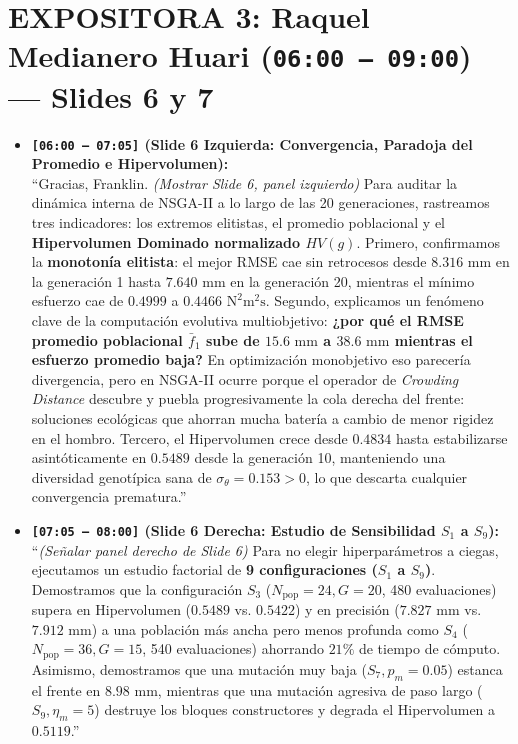 \documentclass[11pt,a4paper]{article}
\begin{document}
\section*{EXPOSITORA 3: Raquel Medianero Huari (\texttt{06:00 -- 09:00}) — Slides 6 y 7}
\begin{itemize}
    \item \textbf{\texttt{[06:00 -- 07:05]} (Slide 6 Izquierda: Convergencia, Paradoja del Promedio e Hipervolumen):} \\
    ``Gracias, Franklin. \textit{(Mostrar Slide 6, panel izquierdo)} Para auditar la dinámica interna de NSGA-II a lo largo de las 20 generaciones, rastreamos tres indicadores: los extremos elitistas, el promedio poblacional y el \textbf{Hipervolumen Dominado normalizado $HV(g)$}. Primero, confirmamos la \textbf{monotonía elitista}: el mejor RMSE cae sin retrocesos desde $8.316\text{ mm}$ en la generación 1 hasta \textbf{$7.640\text{ mm}$} en la generación 20, mientras el mínimo esfuerzo cae de $0.4999$ a \textbf{$0.4466\text{ N}^2\text{m}^2\text{s}$}. Segundo, explicamos un fenómeno clave de la computación evolutiva multiobjetivo: \textbf{¿por qué el RMSE promedio poblacional $\bar{f}_1$ sube de $15.6\text{ mm}$ a $38.6\text{ mm}$ mientras el esfuerzo promedio baja?} En optimización monobjetivo eso parecería divergencia, pero en NSGA-II ocurre porque el operador de \textit{Crowding Distance} descubre y puebla progresivamente la cola derecha del frente: soluciones ecológicas que ahorran mucha batería a cambio de menor rigidez en el hombro. Tercero, el Hipervolumen crece desde $0.4834$ hasta estabilizarse asintóticamente en \textbf{$0.5489$} desde la generación 10, manteniendo una diversidad genotípica sana de $\sigma_\theta = 0.153 > 0$, lo que descarta cualquier convergencia prematura.''

    \item \textbf{\texttt{[07:05 -- 08:00]} (Slide 6 Derecha: Estudio de Sensibilidad $S_1$ a $S_9$):} \\
    ``\textit{(Señalar panel derecho de Slide 6)} Para no elegir hiperparámetros a ciegas, ejecutamos un estudio factorial de \textbf{9 configuraciones ($S_1$ a $S_9$)}. Demostramos que la configuración $S_3$ ($N_{\text{pop}}=24, G=20$, 480 evaluaciones) supera en Hipervolumen ($0.5489$ vs. $0.5422$) y en precisión ($7.827\text{ mm}$ vs. $7.912\text{ mm}$) a una población más ancha pero menos profunda como $S_4$ ($N_{\text{pop}}=36, G=15$, 540 evaluaciones) ahorrando $21\%$ de tiempo de cómputo. Asimismo, demostramos que una mutación muy baja ($S_7, p_m=0.05$) estanca el frente en $8.98\text{ mm}$, mientras que una mutación agresiva de paso largo ($S_9, \eta_m=5$) destruye los bloques constructores y degrada el Hipervolumen a $0.5119$.''


\end{itemize}
\end{document}
